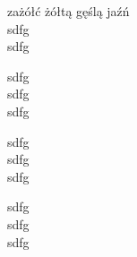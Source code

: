 
\begin{song}
zażółć żółtą gęślą jaźń\\
sdfg\\
sdfg\\
\begin{chorus}
sdfg\\
sdfg\\
sdfg\\
\end{chorus}
sdfg\\
sdfg\\
sdfg\\
\begin{chorus}
sdfg\\
sdfg\\
sdfg\\
\end{chorus}
\end{song}
